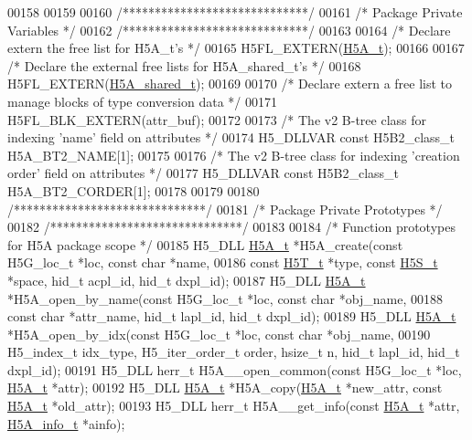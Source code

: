 \begin{DoxyCode}
00158 
00159 
00160 \textcolor{comment}{/*****************************/}
00161 \textcolor{comment}{/* Package Private Variables */}
00162 \textcolor{comment}{/*****************************/}
00163 
00164 \textcolor{comment}{/* Declare extern the free list for H5A\_t's */}
00165 H5FL\_EXTERN(\hyperlink{struct_h5_a__t}{H5A\_t});
00166 
00167 \textcolor{comment}{/* Declare the external free lists for H5A\_shared\_t's */}
00168 H5FL\_EXTERN(\hyperlink{struct_h5_a__shared__t}{H5A\_shared\_t});
00169 
00170 \textcolor{comment}{/* Declare extern a free list to manage blocks of type conversion data */}
00171 H5FL\_BLK\_EXTERN(attr\_buf);
00172 
00173 \textcolor{comment}{/* The v2 B-tree class for indexing 'name' field on attributes */}
00174 H5\_DLLVAR \textcolor{keyword}{const} H5B2\_class\_t H5A\_BT2\_NAME[1];
00175 
00176 \textcolor{comment}{/* The v2 B-tree class for indexing 'creation order' field on attributes */}
00177 H5\_DLLVAR \textcolor{keyword}{const} H5B2\_class\_t H5A\_BT2\_CORDER[1];
00178 
00179 
00180 \textcolor{comment}{/******************************/}
00181 \textcolor{comment}{/* Package Private Prototypes */}
00182 \textcolor{comment}{/******************************/}
00183 
00184 \textcolor{comment}{/* Function prototypes for H5A package scope */}
00185 H5\_DLL \hyperlink{struct_h5_a__t}{H5A\_t} *H5A\_create(\textcolor{keyword}{const} H5G\_loc\_t *loc, \textcolor{keyword}{const} \textcolor{keywordtype}{char} *name,
00186     \textcolor{keyword}{const} \hyperlink{struct_h5_t__t}{H5T\_t} *type, \textcolor{keyword}{const} \hyperlink{struct_h5_s__t}{H5S\_t} *space, hid\_t acpl\_id, hid\_t dxpl\_id);
00187 H5\_DLL \hyperlink{struct_h5_a__t}{H5A\_t} *H5A\_open\_by\_name(\textcolor{keyword}{const} H5G\_loc\_t *loc, \textcolor{keyword}{const} \textcolor{keywordtype}{char} *obj\_name,
00188     \textcolor{keyword}{const} \textcolor{keywordtype}{char} *attr\_name, hid\_t lapl\_id, hid\_t dxpl\_id);
00189 H5\_DLL \hyperlink{struct_h5_a__t}{H5A\_t} *H5A\_open\_by\_idx(\textcolor{keyword}{const} H5G\_loc\_t *loc, \textcolor{keyword}{const} \textcolor{keywordtype}{char} *obj\_name,
00190     H5\_index\_t idx\_type, H5\_iter\_order\_t order, hsize\_t n, hid\_t lapl\_id, hid\_t dxpl\_id);
00191 H5\_DLL herr\_t H5A\_\_open\_common(\textcolor{keyword}{const} H5G\_loc\_t *loc, \hyperlink{struct_h5_a__t}{H5A\_t} *attr);
00192 H5\_DLL \hyperlink{struct_h5_a__t}{H5A\_t} *H5A\_copy(\hyperlink{struct_h5_a__t}{H5A\_t} *new\_attr, \textcolor{keyword}{const} \hyperlink{struct_h5_a__t}{H5A\_t} *old\_attr);
00193 H5\_DLL herr\_t H5A\_\_get\_info(\textcolor{keyword}{const} \hyperlink{struct_h5_a__t}{H5A\_t} *attr, \hyperlink{struct_h5_a__info__t}{H5A\_info\_t} *ainfo);

\end{DoxyCode}
